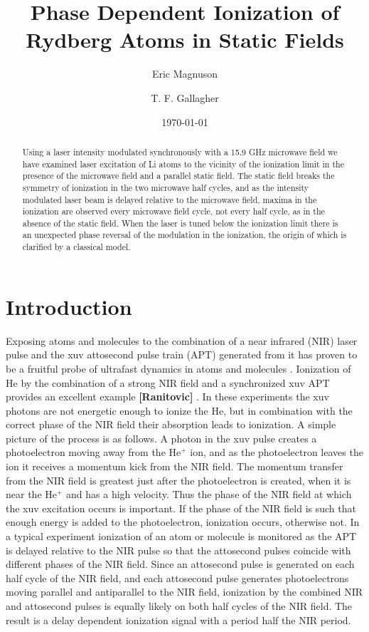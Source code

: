 \documentclass[aps,pra,preprint,groupedaddress]{revtex4-1}
\begin{document}
\title{Phase Dependent Ionization of Rydberg Atoms in Static Fields}
\author{Eric Magnuson}
\author{T. F. Gallagher}
\date{\today}


\begin{abstract}
Using a laser intensity modulated synchronously with a 15.9 GHz microwave field we have examined laser excitation of Li atoms to the vicinity of the ionization limit in the presence of the microwave field and a parallel static field. The static field breaks the symmetry of ionization in the two microwave half cycles, and as the intensity modulated laser beam is delayed relative to the microwave field, maxima in the ionization are observed every microwave field cycle, not every half cycle, as in the absence of the static field. When the laser is tuned below the ionization limit there is an unexpected phase reversal of the modulation in the ionization, the origin of which is clarified by a classical model.
\end{abstract}


\pacs{}


\maketitle


\section{\label{sec:intro}Introduction}


Exposing atoms and molecules to the combination of a near infrared (NIR) laser pulse and the xuv attosecond pulse train (APT) generated from it has proven to be a fruitful probe of ultrafast dynamics in atoms and molecules \cite{Krausz}. Ionization of He by the combination of a strong NIR field and a synchronized xuv APT provides an excellent example \textbf{[Ranitovic]} \cite{Johnsson, Tong}.  In these experiments the xuv photons are not energetic enough to ionize the He, but in combination with the correct phase of the NIR field their absorption leads to ionization. A simple picture of the process is as follows. A photon in the xuv pulse creates a photoelectron moving away from the He$^+$ ion, and as the photoelectron leaves the ion it receives a momentum kick from the NIR field. The momentum transfer from the NIR field is greatest just after the photoelectron is created, when it is near the He$^+$ and has a high velocity. Thus the phase of the NIR field at which the xuv excitation occurs is important. If the phase of the NIR field is such that enough energy is added to the photoelectron, ionization occurs, otherwise not. In a typical experiment ionization of an atom or molecule is monitored as the APT is delayed relative to the NIR pulse so that the attosecond pulses coincide with different phases of the NIR field. Since an attosecond  pulse is generated on each half cycle of the NIR field, and each attosecond pulse generates photoelectrons moving parallel and antiparallel to the NIR field, ionization by the combined NIR and attosecond pulses is equally likely on both half cycles of the NIR field. The result is a delay dependent ionization signal with a period half the NIR period.
\end{document}
